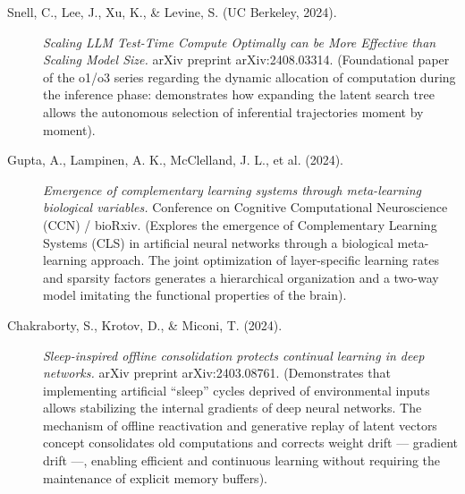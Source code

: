 \documentclass[11pt,a4paper,oneside]{article} %
\begin{document}
\begin{description}
\item[Snell, C., Lee, J., Xu, K., \& Levine, S. (UC Berkeley, 2024).] \emph{Scaling LLM Test-Time Compute Optimally can be More Effective than Scaling Model Size.} arXiv preprint arXiv:2408.03314. (Foundational paper of the o1/o3 series regarding the dynamic allocation of computation during the inference phase: demonstrates how expanding the latent search tree allows the autonomous selection of inferential trajectories moment by moment).
\end{description}

\hypertarget{a1.5-recursive-meta-learning-and-synthetic-cls-architectures}{%
\label{a1.5-recursive-meta-learning-and-synthetic-cls-architectures}}

\begin{description}
\item[Gupta, A., Lampinen, A. K., McClelland, J. L., et al. (2024).] \emph{Emergence of complementary learning systems through meta-learning biological variables.} Conference on Cognitive Computational Neuroscience (CCN) / bioRxiv. (Explores the emergence of Complementary Learning Systems (CLS) in artificial neural networks through a biological meta-learning approach. The joint optimization of layer-specific learning rates and sparsity factors generates a hierarchical organization and a two-way model imitating the functional properties of the brain).

\item[Chakraborty, S., Krotov, D., \& Miconi, T. (2024).] \emph{Sleep-inspired offline consolidation protects continual learning in deep networks.} arXiv preprint arXiv:2403.08761. (Demonstrates that implementing artificial ``sleep'' cycles deprived of environmental inputs allows stabilizing the internal gradients of deep neural networks. The mechanism of offline reactivation and generative replay of latent vectors concept consolidates old computations and corrects weight drift --- gradient drift ---, enabling efficient and continuous learning without requiring the maintenance of explicit memory buffers).
\end{description}


\hypertarget{a1.6-regularized-continual-learning-catastrophic-forgetting-and-gradient-drift}{%
\label{a1.6-regularized-continual-learning-catastrophic-forgetting-and-gradient-drift}}
\end{document}
